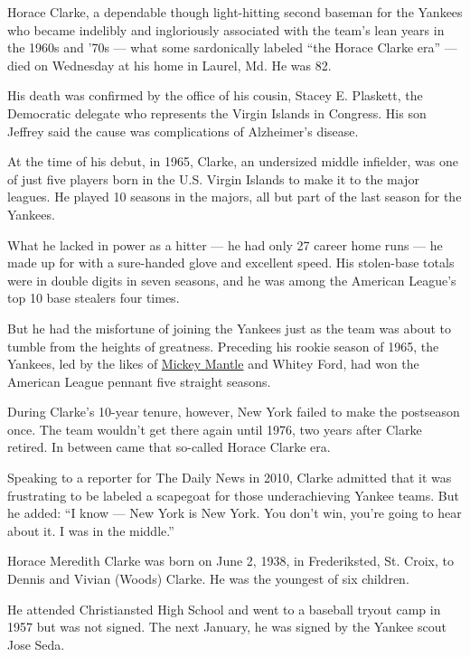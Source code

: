 Horace Clarke, a dependable though light-hitting second baseman for the
Yankees who became indelibly and ingloriously associated with the team's
lean years in the 1960s and '70s --- what some sardonically labeled
``the Horace Clarke era'' --- died on Wednesday at his home in Laurel,
Md. He was 82.

His death was confirmed by the office of his cousin, Stacey E. Plaskett,
the Democratic delegate who represents the Virgin Islands in Congress.
His son Jeffrey said the cause was complications of Alzheimer's disease.

At the time of his debut, in 1965, Clarke, an undersized middle
infielder, was one of just five players born in the U.S. Virgin Islands
to make it to the major leagues. He played 10 seasons in the majors, all
but part of the last season for the Yankees.

What he lacked in power as a hitter --- he had only 27 career home runs
--- he made up for with a sure-handed glove and excellent speed. His
stolen-base totals were in double digits in seven seasons, and he was
among the American League's top 10 base stealers four times.

But he had the misfortune of joining the Yankees just as the team was
about to tumble from the heights of greatness. Preceding his rookie
season of 1965, the Yankees, led by the likes of
\href{https://www.nytimes.com/1995/08/14/obituaries/mickey-mantle-great-yankee-slugger-dies-at-63.html\#:~:text=Mickey\%20Mantle\%2C\%20the\%20most\%20powerful,died\%20at\%202\%3A10\%20A.M.\&text=9\%2C\%20the\%20hospital\%20said\%20the\%20cancer\%20had\%20spread\%20to\%20his\%20abdomen.}{Mickey
Mantle} and Whitey Ford, had won the American League pennant five
straight seasons.

During Clarke's 10-year tenure, however, New York failed to make the
postseason once. The team wouldn't get there again until 1976, two years
after Clarke retired. In between came that so-called Horace Clarke era.

Speaking to a reporter for The Daily News in 2010, Clarke admitted that
it was frustrating to be labeled a scapegoat for those underachieving
Yankee teams. But he added: ``I know --- New York is New York. You don't
win, you're going to hear about it. I was in the middle.''

Horace Meredith Clarke was born on June 2, 1938, in Frederiksted, St.
Croix, to Dennis and Vivian (Woods) Clarke. He was the youngest of six
children.

He attended Christiansted High School and went to a baseball tryout camp
in 1957 but was not signed. The next January, he was signed by the
Yankee scout Jose Seda.


